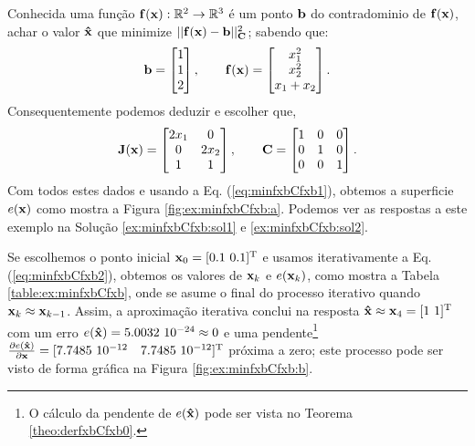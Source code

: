 \begin{example}
\label{ex:minfxbCfxb}
Conhecida uma função $\VECTOR{f}(\VECTOR{x}) : \mathbb{R}^{2} \rightarrow \mathbb{R}^{3}$
é um ponto $\VECTOR{b}$ do contradominio de $\VECTOR{f}(\VECTOR{x})$,
achar o valor $\VECTOR{\hat{x}}$ que minimize $||\VECTOR{f}(\VECTOR{x})-\VECTOR{b}||_{\MATRIX{C}}^2$;
sabendo que:
\begin{equation}
\VECTOR{b}=\begin{bmatrix}
1\\
1\\
2
\end{bmatrix},
\qquad 
\VECTOR{f}(\VECTOR{x})=\begin{bmatrix}
x_1^2\\
x_2^2\\
x_1+x_2
\end{bmatrix}.
\end{equation}
Consequentemente podemos deduzir e escolher que, 
\begin{equation}\label{eq:lab:ex2fx}
\MATRIX{J}(\VECTOR{x})=\begin{bmatrix}
2 x_1 & 0\\
0 & 2 x_2\\
1 & 1
\end{bmatrix},
\qquad
\MATRIX{C}=\begin{bmatrix}
1 & 0 & 0\\
0 & 1 & 0\\
0 & 0 & 1
\end{bmatrix}.
\end{equation}
Com todos estes dados e usando a Eq. (\ref{eq:minfxbCfxb1}),
obtemos a superficie $e(\VECTOR{x})$ como mostra a Figura \ref{fig:ex:minfxbCfxb:a}.
Podemos ver as respostas a este exemplo na Solução \ref{ex:minfxbCfxb:sol1} e \ref{ex:minfxbCfxb:sol2}.
\end{example}

\begin{SolutionT}
\label{ex:minfxbCfxb:sol1}
Se escolhemos o ponto inicial $\VECTOR{x}_0=[0.1~0.1]^{\transpose}$ e 
usamos iterativamente a Eq. (\ref{eq:minfxbCfxb2}), obtemos os valores 
de $\VECTOR{x}_k$ e $e(\VECTOR{x}_k)$, como mostra a Tabela \ref{table:ex:minfxbCfxb},
onde se asume o final do processo iterativo quando $\VECTOR{x}_k \approx \VECTOR{x}_{k-1}$.
Assim, a aproximação iterativa conclui na resposta $\VECTOR{\hat{x}}\approx \VECTOR{x}_{4} =[1~1]^{\transpose}$
com um erro $e(\VECTOR{\hat{x}})=5.0032~10^{-24}\approx 0$ e uma pendente\footnote{\label{ref:pendenteex} O
cálculo da pendente de $e(\VECTOR{\hat{x}})$ pode ser vista no Teorema \ref{theo:derfxbCfxb0}.}
$\frac{\partial e(\VECTOR{\hat{x}})}{\partial \VECTOR{x} }=[7.7485~10^{-12}\quad 7.7485~10^{-12}]^{\transpose}$
próxima a zero;
este processo pode ser visto de forma gráfica na Figura \ref{fig:ex:minfxbCfxb:b}.
\end{SolutionT}


